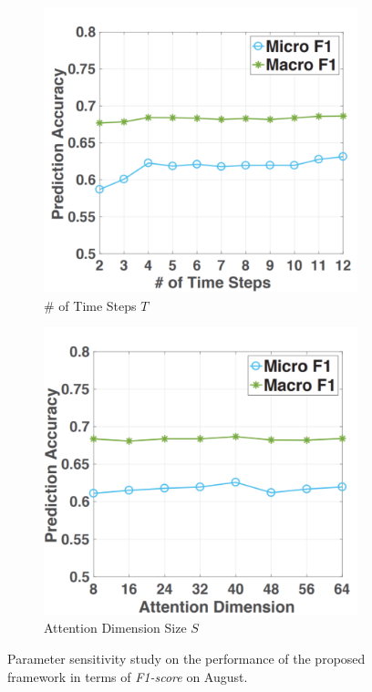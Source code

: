 \begin{figure}[!h]
    \vspace{0.5cm}

    \begin{subfigure}{0.45\textwidth}
        \centering
        \includegraphics[width=0.9\linewidth]{Chapter5/Images/macro/c.png}
        \caption{\# of Time Steps $T$}
        \label{fig:mac3}
    \end{subfigure}
    \begin{subfigure}{0.45\textwidth}
        \centering
        \includegraphics[width=0.9\linewidth]{Chapter5/Images/macro/d.png}
        \caption{Attention Dimension Size $S$}
        \label{fig:mac4}
    \end{subfigure}
 
    \caption{Parameter sensitivity study on the performance of
    the proposed framework in terms of \emph{F1-score} on August.}
    \label{fig:img3}
\end{figure}


